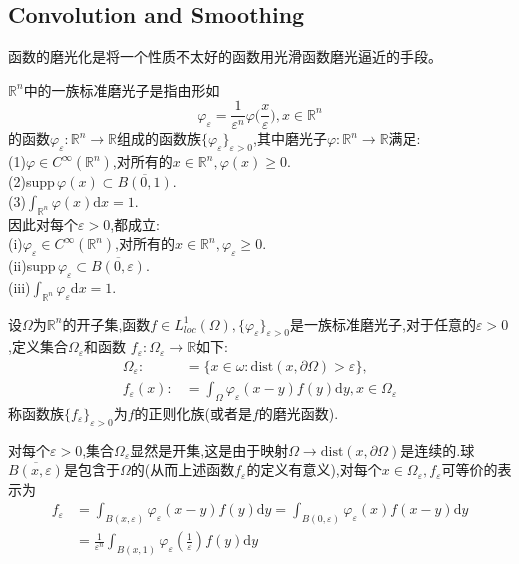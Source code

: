 \documentclass[a4paper,UTF8,12pt]{ctexart}
\begin{document}
\subsection{Convolution and Smoothing}
函数的磨光化是将一个性质不太好的函数用光滑函数磨光逼近的手段。\par
$\mathbb{R}^n$中的一族标准磨光子是指由形如
$$
\varphi_{\varepsilon}=\frac{1}{\varepsilon ^n}\varphi \bigl(\frac{x}{\varepsilon}\bigr),x\in \mathbb{R}^n
$$
的函数$\varphi _{\varepsilon}:\mathbb{R}^n\to \mathbb{R}$组成的函数族$\{\varphi _{\varepsilon}\}_{\varepsilon> 0}$,其中磨光子$\varphi:\mathbb{R}^n\to \mathbb{R}$满足:\\
(1)$\varphi\in C^{\infty}(\mathbb{R}^n)$,对所有的$x\in\mathbb{R}^n,\varphi (x)\geqslant 0$.\\
(2)supp\,$\varphi (x)\subset \overline{B(0,1)}$.\\
(3)$\int_{\mathbb{R}^n}\varphi (x)\mathrm{d}x=1$.\\
因此对每个$\varepsilon>0$,都成立:\\
(i)$\varphi_{\varepsilon}\in C^{\infty}(\mathbb{R}^n)$,对所有的$x\in\mathbb{R}^n,\varphi_{\varepsilon}\geqslant 0$.\\
(ii)supp\,$\varphi_{\varepsilon}\subset \overline{B(0,\varepsilon)}$.\\
(iii)$\int_{\mathbb{R}^n}\varphi_{\varepsilon}\mathrm{d}x=1$.\par
设$\Omega$为$\mathbb{R}^n$的开子集,函数$f\in L^1_{loc}(\Omega),\{\varphi _{\varepsilon}\}_{\varepsilon> 0}$是一族标准磨光子,对于任意的$\varepsilon >0$,定义集合$\Omega _{\varepsilon}$和函数
$f_{\varepsilon}:\Omega _{\varepsilon}\to\mathbb{R}$如下:
$$
\begin{aligned}
    \Omega _{\varepsilon}: &=\{x\in \omega:\text{dist}(x,\partial \Omega)>\varepsilon\},\\
    f_{\varepsilon}(x)   : &= \int_{\Omega}\varphi_{\varepsilon}(x-y)f(y)\mathrm{d}y,x\in\Omega_{\varepsilon}
\end{aligned}
$$
称函数族$\{f_{\varepsilon}\}_{\varepsilon >0}$为$f$的正则化族(或者是$f$的磨光函数).\par
对每个$\varepsilon >0$,集合$\Omega_{\varepsilon}$显然是开集,这是由于映射$\Omega\to\text{dist}(x,\partial \Omega)$是连续的.球$\overline{B(x,\varepsilon)}$是包含于$\Omega$的(从而上述函数$f_{\varepsilon}$的定义有意义),对每个$x\in\Omega_{\varepsilon},f_{\varepsilon}$可等价的表示为
$$
\begin{aligned}
    f_{\varepsilon} &= \int_{B(x,\varepsilon)}\varphi_{\varepsilon}(x-y)f(y)\mathrm{d}y=\int_{B(0,\varepsilon)}\varphi_{\varepsilon}(x)f(x-y)\mathrm{d}y\\
                    &= \frac{1}{\varepsilon^n}\int_{B(x,1)}\varphi_{\varepsilon}(\frac{1}{\varepsilon})f(y)\mathrm{d}y
\end{aligned}
$$
\end{document}
